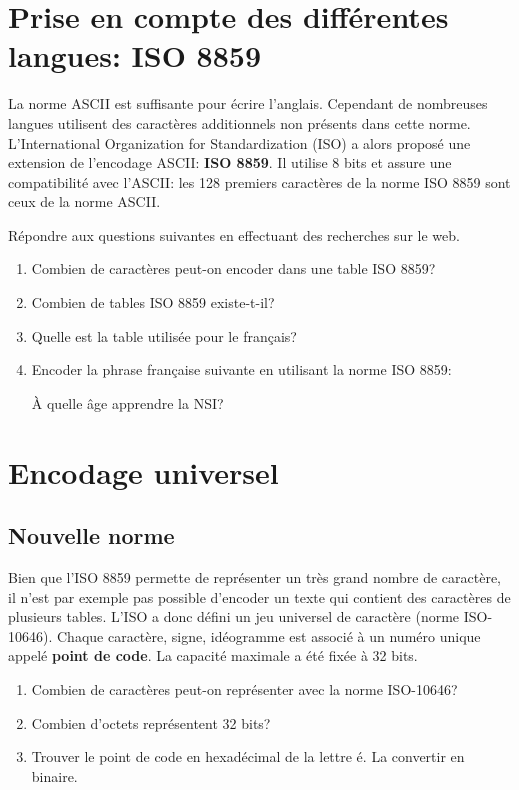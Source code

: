 \documentclass[a4paper,11pt]{article}
\begin{document}
\begin{Form}
\section{Prise en compte des différentes langues: ISO 8859}
La norme ASCII est suffisante pour écrire l'anglais. Cependant de nombreuses langues utilisent des caractères additionnels non présents dans cette norme.\\
L'International Organization for Standardization (ISO) a alors proposé une extension de l'encodage ASCII: \textbf{ISO 8859}. Il utilise 8 bits et assure une compatibilité avec l'ASCII: les 128 premiers caractères de la norme ISO 8859 sont ceux de la norme ASCII.
\begin{activite}
Répondre aux questions suivantes en effectuant des recherches sur le web.
\begin{enumerate}
\item Combien de caractères peut-on encoder dans une table ISO 8859?
\item Combien de tables ISO 8859 existe-t-il?
\item Quelle est la table utilisée pour le français?
\item Encoder la phrase française suivante en utilisant la norme ISO 8859:
\begin{center}
À quelle âge apprendre la NSI? 
\end{center}
\end{enumerate}
\end{activite}
\section{Encodage universel}
\subsection{Nouvelle norme}
Bien que l'ISO 8859 permette de représenter un très grand nombre de caractère, il n'est par exemple pas possible d'encoder un texte qui contient des caractères de plusieurs tables. L'ISO a donc défini un jeu universel de caractère (norme ISO-10646). Chaque caractère, signe, idéogramme est associé à un numéro unique appelé \textbf{point de code}. La capacité maximale a été fixée à 32 bits.
\begin{activite}
\begin{enumerate}
\item Combien de caractères peut-on représenter avec la norme ISO-10646?
\item Combien d'octets représentent 32 bits?
\item Trouver le point de code en hexadécimal de la lettre é. La convertir en binaire.
\end{enumerate}
\end{activite}

\end{Form}
\end{document}
